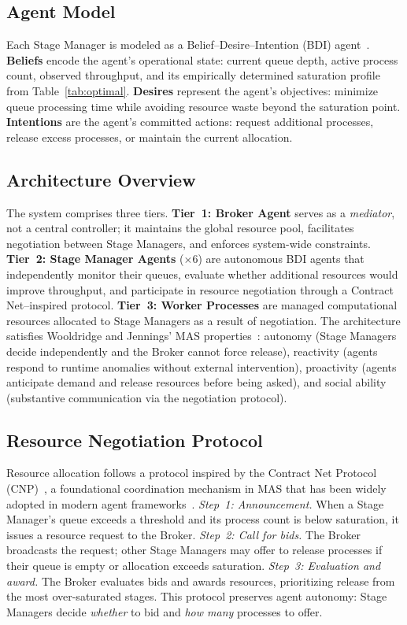 \documentclass[conference]{IEEEtran}
\begin{document}
\subsection{Agent Model}

Each Stage Manager is modeled as a Belief--Desire--Intention (BDI) agent~\cite{wooldridge1995}. \textbf{Beliefs} encode the agent's operational state: current queue depth, active process count, observed throughput, and its empirically determined saturation profile from Table~\ref{tab:optimal}. \textbf{Desires} represent the agent's objectives: minimize queue processing time while avoiding resource waste beyond the saturation point. \textbf{Intentions} are the agent's committed actions: request additional processes, release excess processes, or maintain the current allocation.

\subsection{Architecture Overview}

The system comprises three tiers. \textbf{Tier~1: Broker Agent} serves as a \textit{mediator}, not a central controller; it maintains the global resource pool, facilitates negotiation between Stage Managers, and enforces system-wide constraints. \textbf{Tier~2: Stage Manager Agents} ($\times$6) are autonomous BDI agents that independently monitor their queues, evaluate whether additional resources would improve throughput, and participate in resource negotiation through a Contract Net--inspired protocol. \textbf{Tier~3: Worker Processes} are managed computational resources allocated to Stage Managers as a result of negotiation. The architecture satisfies Wooldridge and Jennings' MAS properties~\cite{wooldridge1995}: autonomy (Stage Managers decide independently and the Broker cannot force release), reactivity (agents respond to runtime anomalies without external intervention), proactivity (agents anticipate demand and release resources before being asked), and social ability (substantive communication via the negotiation protocol).

\subsection{Resource Negotiation Protocol}

Resource allocation follows a protocol inspired by the Contract Net Protocol (CNP)~\cite{smith1980}, a foundational coordination mechanism in MAS that has been widely adopted in modern agent frameworks~\cite{dorri2018}. \textit{Step~1: Announcement.} When a Stage Manager's queue exceeds a threshold and its process count is below saturation, it issues a resource request to the Broker. \textit{Step~2: Call for bids.} The Broker broadcasts the request; other Stage Managers may offer to release processes if their queue is empty or allocation exceeds saturation. \textit{Step~3: Evaluation and award.} The Broker evaluates bids and awards resources, prioritizing release from the most over-saturated stages. This protocol preserves agent autonomy: Stage Managers decide \textit{whether} to bid and \textit{how many} processes to offer.
\end{document}

